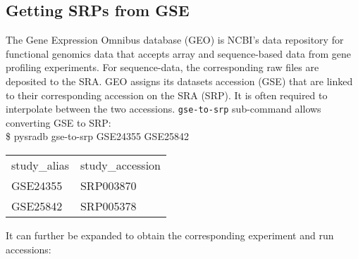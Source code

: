\documentclass[9pt,a4paper]{extarticle}
\newenvironment{allintypewriter}{\ttfamily}{\par}
\begin{document}


\subsection*{Getting SRPs from GSE}

The Gene Expression Omnibus database (GEO) \cite{barrett2012ncbi} is NCBI's data repository
for functional genomics data that accepts array and sequence-based data from gene
profiling experiments. For sequence-data, the corresponding raw files are deposited
to the SRA. GEO assigns its datasets accession (GSE) that are linked to their corresponding
accession on the SRA (SRP). It is often required to interpolate between the two accessions.
\texttt{gse-to-srp} sub-command allows converting GSE to SRP:\\

\begin{allintypewriter}
\$ pysradb gse-to-srp GSE24355 GSE25842
\begin{table}[H]
    \begin{tabular}{ll}
    study_alias & study_accession\\
    GSE24355 & SRP003870\\
    GSE25842 & SRP005378\\
    \end{tabular}
\end{table}
\end{allintypewriter}

It can further be expanded to obtain the corresponding experiment and
run accessions:\\
\end{document}
